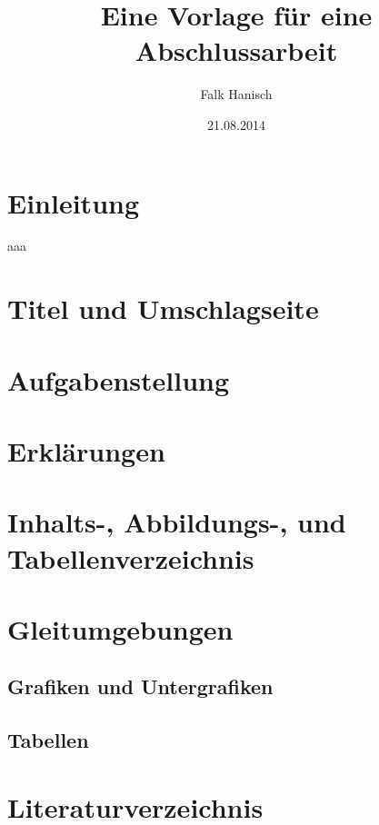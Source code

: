 \documentclass[english,ngerman]{tudscrartcl}
\begin{document}
\title{Eine Vorlage für eine Abschlussarbeit}
\author{Falk Hanisch}
\date{21.08.2014}
\StartTutorial[\tableofcontents]
%
\section{Einleitung}
aaa

\section{Titel und Umschlagseite}

\section{Aufgabenstellung}

\section{Erklärungen}

\section{Inhalts-, Abbildungs-, und Tabellenverzeichnis}



\section{Gleitumgebungen}
\subsection{Grafiken und Untergrafiken}
\subsection{Tabellen}

\section{Literaturverzeichnis}
\end{document}
